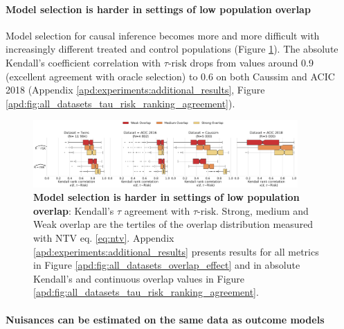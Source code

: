 \documentclass[10pt]{article}
\begin{document}
\begin{multicols}{2}
    \paragraph{Model selection is harder in settings of low population
        overlap}

    Model selection for
    causal inference becomes more and more difficult with increasingly different
    treated and control populations
    (Figure \ref{fig:all_datasets_overlap_effect_r_risk}). The
    absolute Kendall's coefficient correlation with $\tau\text{-risk}$
    drops from values around 0.9 (excellent agreement with oracle selection) to 0.6 on
    both Caussim and ACIC 2018
    (Appendix \ref{apd:experiments:additional_results},
    Figure {\ref{apd:fig:all_datasets_tau_risk_ranking_agreement}}).

    \begin{figure}[!h]
        \centering
        \includegraphics[width=0.9\textwidth]{images/_2_overlap_influence_overlap_by_bin_comparaison_kendall_by_Dataset_r_risk_only.pdf}
        \hfill
        \caption{\textbf{Model selection is harder in settings of low population
                overlap}:
            Kendall's $\tau$ agreement with $\tau\text{-risk}$. Strong, medium and Weak overlap
            are the tertiles of the overlap distribution measured with NTV eq. \ref{eq:ntv}. Appendix \ref{apd:experiments:additional_results} presents results for all
            metrics in Figure \ref{apd:fig:all_datasets_overlap_effect} and in absolute
            Kendall's and continuous overlap values in Figure
                {\ref{apd:fig:all_datasets_tau_risk_ranking_agreement}}.}\label{fig:all_datasets_overlap_effect_r_risk}
    \end{figure}



    \paragraph{Nuisances can be estimated on the same data as outcome models}


\end{multicols}
\end{document}
